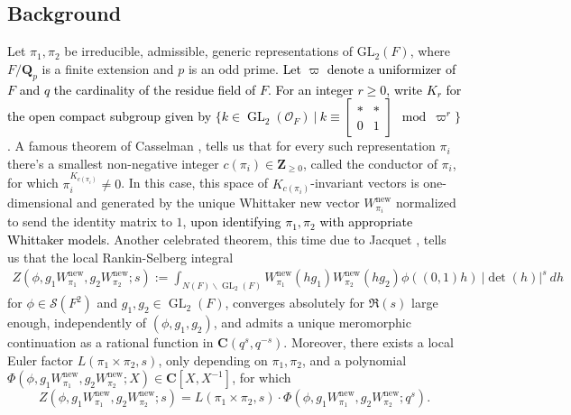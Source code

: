 \documentclass{amsart}
\theoremstyle{plain}
\theoremstyle{plain}
\theoremstyle{remark}
\DeclareMathOperator{\GL}{GL}
\begin{document}
\subsection{Background}
Let $\pi_1,\pi_2$ be irreducible, admissible, generic representations of $\mathrm{GL}_2(F)$, where $F/\mathbf{Q}_p$ is a finite extension and $p$ is an odd prime. \textcolor{black}{Let $\varpi$ denote a uniformizer of $F$ and $q$ the cardinality of the residue field of $F$. For an integer $r\geq 0$, write $K_r$ for the open compact subgroup given by $\{k\in \GL_2(\mathcal{O}_F)\ |\ k\equiv \left[\begin{smallmatrix}
    * & * \\
    0 & 1
\end{smallmatrix}\right]\mod \varpi^r\}$}. A famous theorem of Casselman \cite{casselman1973some}, tells us that for every such representation $\pi_i$ there's a smallest non-negative integer $c(\pi_i)\in\mathbf{Z}_{\geq 0}$, called the conductor of $\pi_i$, for which $\pi_i^{K_{c(\pi_i)}}\neq 0$. In this case, this space of $K_{c(\pi_i)}$-invariant vectors is one-dimensional and generated by the unique Whittaker new vector $W_{\pi_i}^\mathrm{new}$ normalized to send the identity matrix to $1$, \textcolor{black}{upon identifying $\pi_1,\pi_2$ with appropriate Whittaker models.} Another celebrated theorem, this time due to Jacquet \cite{automorphic_on_GL_II}, tells us that the local Rankin-Selberg integral
\begin{align}\label{eq: intro A}
Z(\phi,g_1W_{\pi_1}^\mathrm{new},g_2W_{\pi_2}^\mathrm{new};s):=\int_{N(F)\backslash \GL_2(F)} W_{\pi_1}^\mathrm{new}(hg_1)W_{\pi_2}^\mathrm{new}(hg_2)\phi((0,1)h)\ |\det(h)|^s\ dh
\end{align}
for $\phi\in\mathcal{S}(F^2)$ and $g_1,g_2\in \GL_2(F)$, converges absolutely for $\Re(s)$ large enough, independently of $(\phi,g_1,g_2)$, and admits \textcolor{black}{a} unique meromorphic continuation as a rational function in $\mathbf{C}(q^s,q^{-s})$. Moreover, there exists a local Euler factor $L(\pi_1\times\pi_2,s)$, only depending on $\pi_1,\pi_2$, and a polynomial $\Phi(\phi,g_1W_{\pi_1}^\mathrm{new},g_2W_{\pi_2}^\mathrm{new};X)\in\mathbf{C}[X,X^{-1}]$, for which 
$$Z(\phi,g_1W_{\pi_1}^\mathrm{new},g_2W_{\pi_2}^\mathrm{new};s)=L(\pi_1\times\pi_2,s)\cdot \Phi(\phi,g_1W_{\pi_1}^\mathrm{new},g_2W_{\pi_2}^\mathrm{new};q^s).$$
\end{document}
